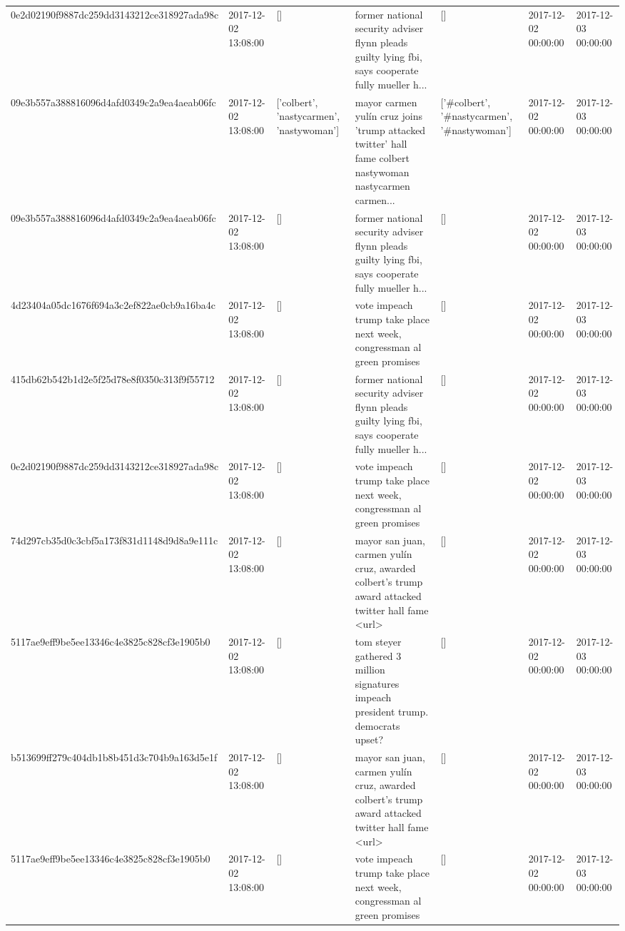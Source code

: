 \begin{tabular}{lllllll}
0e2d02190f9887dc259dd3143212ce318927ada98c & 2017-12-02 13:08:00 & [] & former national security adviser flynn pleads guilty lying fbi, says cooperate fully mueller h... & [] & 2017-12-02 00:00:00 & 2017-12-03 00:00:00 \\
09e3b557a388816096d4afd0349c2a9ea4aeab06fc & 2017-12-02 13:08:00 & ['colbert', 'nastycarmen', 'nastywoman'] & mayor carmen yulín cruz joins 'trump attacked twitter' hall fame colbert nastywoman nastycarmen carmen... & ['#colbert', '#nastycarmen', '#nastywoman'] & 2017-12-02 00:00:00 & 2017-12-03 00:00:00 \\
09e3b557a388816096d4afd0349c2a9ea4aeab06fc & 2017-12-02 13:08:00 & [] & former national security adviser flynn pleads guilty lying fbi, says cooperate fully mueller h... & [] & 2017-12-02 00:00:00 & 2017-12-03 00:00:00 \\
4d23404a05dc1676f694a3c2ef822ae0cb9a16ba4c & 2017-12-02 13:08:00 & [] & vote impeach trump take place next week, congressman al green promises & [] & 2017-12-02 00:00:00 & 2017-12-03 00:00:00 \\
415db62b542b1d2e5f25d78e8f0350c313f9f55712 & 2017-12-02 13:08:00 & [] & former national security adviser flynn pleads guilty lying fbi, says cooperate fully mueller h... & [] & 2017-12-02 00:00:00 & 2017-12-03 00:00:00 \\
0e2d02190f9887dc259dd3143212ce318927ada98c & 2017-12-02 13:08:00 & [] & vote impeach trump take place next week, congressman al green promises & [] & 2017-12-02 00:00:00 & 2017-12-03 00:00:00 \\
74d297cb35d0c3cbf5a173f831d1148d9d8a9e111c & 2017-12-02 13:08:00 & [] & mayor san juan, carmen yulín cruz, awarded colbert's trump award attacked twitter hall fame <url> & [] & 2017-12-02 00:00:00 & 2017-12-03 00:00:00 \\
5117ae9eff9be5ee13346c4e3825c828cf3e1905b0 & 2017-12-02 13:08:00 & [] & tom steyer gathered 3 million signatures impeach president trump. democrats upset? & [] & 2017-12-02 00:00:00 & 2017-12-03 00:00:00 \\
b513699ff279c404db1b8b451d3c704b9a163d5e1f & 2017-12-02 13:08:00 & [] & mayor san juan, carmen yulín cruz, awarded colbert's trump award attacked twitter hall fame <url> & [] & 2017-12-02 00:00:00 & 2017-12-03 00:00:00 \\
5117ae9eff9be5ee13346c4e3825c828cf3e1905b0 & 2017-12-02 13:08:00 & [] & vote impeach trump take place next week, congressman al green promises & [] & 2017-12-02 00:00:00 & 2017-12-03 00:00:00 \\

\end{tabular}
